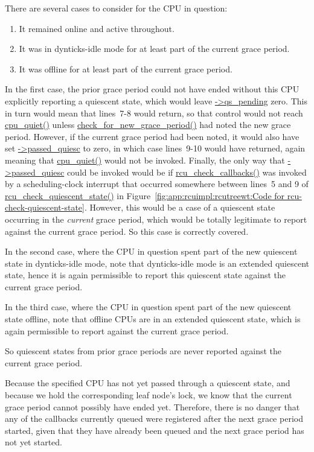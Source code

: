 	There are several cases to consider for the CPU in question:
	\begin{enumerate}
	\item	It remained online and active throughout.
	\item	It was in dynticks-idle mode for at least part of the current
		grace period.
	\item	It was offline for at least part of the current grace period.
	\end{enumerate}

	In the first case, the prior grace period could not have
	ended without this CPU explicitly reporting a quiescent
	state, which would leave \url{->qs_pending} zero.
	This in turn would mean that lines~7-8 would return, so
	that control would not reach \url{cpu_quiet()} unless
	\url{check_for_new_grace_period()} had noted the new grace
	period.
	However, if the current grace period had been noted, it would
	also have set \url{->passed_quiesc} to zero, in which case
	lines~9-10 would have returned, again meaning that \url{cpu_quiet()}
	would not be invoked.
	Finally, the only way that \url{->passed_quiesc} could be invoked
	would be if \url{rcu_check_callbacks()} was invoked by
	a scheduling-clock interrupt that occurred somewhere between
	lines~5 and 9 of \url{rcu_check_quiescent_state()} in
	Figure~\ref{fig:app:rcuimpl:rcutreewt:Code for rcu-check-quiescent-state}.
	However, this would be a case of a quiescent state occurring
	in the \emph{current} grace period, which would be totally
	legitimate to report against the current grace period.
	So this case is correctly covered.

	In the second case, where the CPU in question spent part of
	the new quiescent state in dynticks-idle mode, note that
	dynticks-idle mode is an extended quiescent state, hence
	it is again permissible to report this quiescent state against
	the current grace period.

	In the third case, where the CPU in question spent part of the
	new quiescent state offline, note that offline CPUs are in
	an extended quiescent state, which is again permissible to
	report against the current grace period.

	So quiescent states from prior grace periods are never reported
	against the current grace period.


	Because the specified CPU has not yet passed through a quiescent
	state, and because we hold the corresponding leaf node's lock,
	we know that the current grace period cannot possibly have
	ended yet.
	Therefore, there is no danger that any of the callbacks currently
	queued were registered after the next grace period started, given
	that they have already been queued and the next grace period
	has not yet started.

